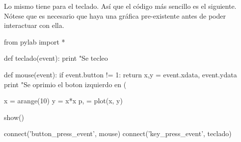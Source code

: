 Lo mismo tiene para el teclado. Así que el código más sencillo es el siguiente. Nótese que es necesario que haya una gráfica pre-existente antes de poder interactuar con ella.
\begin{python}
from pylab import *

def teclado(event):
  print "Se tecleo %

def mouse(event):	
  if event.button != 1: 
    return
  x,y = event.xdata, event.ydata
  print "Se oprimio el boton izquierdo en (%

x = arange(10)
y = x*x
p, = plot(x, y)

show()

connect('button_press_event', mouse)
connect('key_press_event', teclado)
\end{python}